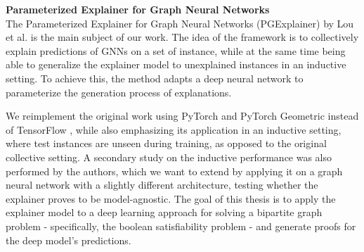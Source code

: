 \textbf{Parameterized Explainer for Graph Neural Networks} \\
The Parameterized Explainer for Graph Neural Networks (PGExplainer) by Lou et al. \cite{luo2020parameterized} is the main subject of our work. The idea of the framework is to collectively explain predictions of GNNs on a set of instance, while at the same time being able to generalize the explainer model to unexplained instances in an inductive setting. To achieve this, the method adapts a deep neural network to parameterize the generation process of explanations. %

We reimplement the original work using PyTorch \cite{paszke2019pytorch} and PyTorch Geometric \cite{Fey/Lenssen/2019} instead of TensorFlow \cite{tensorflow2015-whitepaper}, while also emphasizing its application in an inductive setting, where test instances are unseen during training, as opposed to the original collective setting. A secondary study on the inductive performance was also performed by the authors, which we want to extend by applying it on a graph neural network with a slightly different architecture, testing whether the explainer proves to be model-agnostic. The goal of this thesis is to apply the explainer model to a deep learning approach for solving a bipartite graph problem - specifically, the boolean satisfiability problem - and generate proofs for the deep model's predictions. \bigskip


